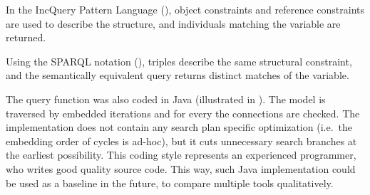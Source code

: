 % 
% 
% 

In the IncQuery Pattern Language \cite{IQlanguage} (), object constraints and reference constraints are used to describe the structure, and individuals matching the  variable are returned.

Using the SPARQL \cite{Sparql} notation (), triples describe the same structural constraint, and the semantically equivalent query returns distinct matches of the  variable.

The query function was also coded in Java (illustrated in ). The model is traversed by embedded iterations and for every  the connections are checked. The implementation does not contain any search plan specific optimization (i.e.\ the embedding order of  cycles is ad-hoc), but it cuts unnecessary search branches at the earliest possibility.  This coding style represents an experienced programmer, who writes good quality source code. This way, such Java implementation could be used as a baseline in the future, to compare multiple tools qualitatively.



